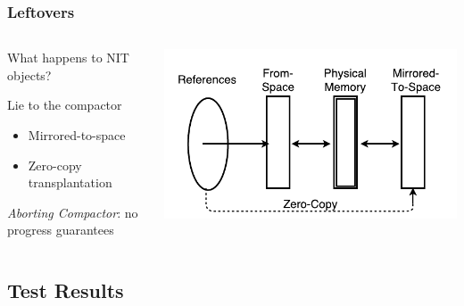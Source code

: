 \documentclass{beamer}
\newcommand{\linespace}{\vskip 0.25cm}
\begin{document}
\begin{frame}

\frametitle{Leftovers}

\begin{columns}
\begin{column}{0.5\textwidth}
What happens to NIT objects?

\linespace
\linespace

Lie to the compactor
\begin{itemize}
\item Mirrored-to-space
\item Zero-copy transplantation
\end{itemize}

\linespace
\linespace

\emph{Aborting Compactor}: no progress guarantees
\end{column}
\begin{column}{0.5\textwidth}

\includegraphics[width=.95\textwidth]{Illustrations/collie_mirrored_rough.pdf}

\end{column}
\end{columns}

\end{frame}



\subsection*{Test Results}
\end{document}
